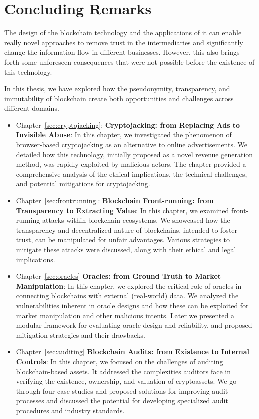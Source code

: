 
\chapter{Concluding Remarks} \label{sec:conclusion}


The design of the blockchain technology and the applications of it can enable really novel approaches to remove trust in the intermediaries and significantly change the information flow in different businesses. However, this also brings forth some unforeseen consequences that were not possible before the existence of this technology.

In this thesis, we have explored how the pseudonymity, transparency, and immutability of blockchain create both opportunities and challenges across different domains.  


\begin{itemize}
    \item Chapter~\ref{sec:cryptojacking}: \textbf{Cryptojacking: from Replacing Ads to Invisible Abuse}: In this chapter, we investigated the phenomenon of browser-based cryptojacking as an alternative to online advertisements. We detailed how this technology, initially proposed as a novel revenue generation method, was rapidly exploited by malicious actors. The chapter provided a comprehensive analysis of the ethical implications, the technical challenges, and potential mitigations for cryptojacking.


    \item Chapter~\ref{sec:frontrunning}: \textbf{Blockchain Front-running: from Transparency to Extracting Value}: In this chapter, we examined front-running attacks within blockchain ecosystems. We showcased how the transparency and decentralized nature of blockchains, intended to foster trust, can be manipulated for unfair advantages. Various strategies to mitigate these attacks were discussed, along with their ethical and legal implications.


    \item Chapter~\ref{sec:oracles} \textbf{Oracles: from Ground Truth to Market Manipulation}: In this chapter, we explored the critical role of oracles in connecting blockchains with external (real-world) data. We analyzed the vulnerabilities inherent in oracle designs and how these can be exploited for market manipulation and other malicious intents. Later we presented a modular framework for evaluating oracle design and reliability, and proposed mitigation strategies and their drawbacks.


    \item Chapter~\ref{sec:auditing} \textbf{Blockchain Audits: from Existence to Internal Controls}: In this chapter, we focused on the challenges of auditing blockchain-based assets. It addressed the complexities auditors face in verifying the existence, ownership, and valuation of cryptoassets. We go through four case studies and proposed solutions for improving audit processes and discussed the potential for developing specialized audit procedures and industry standards. 
\end{itemize}


